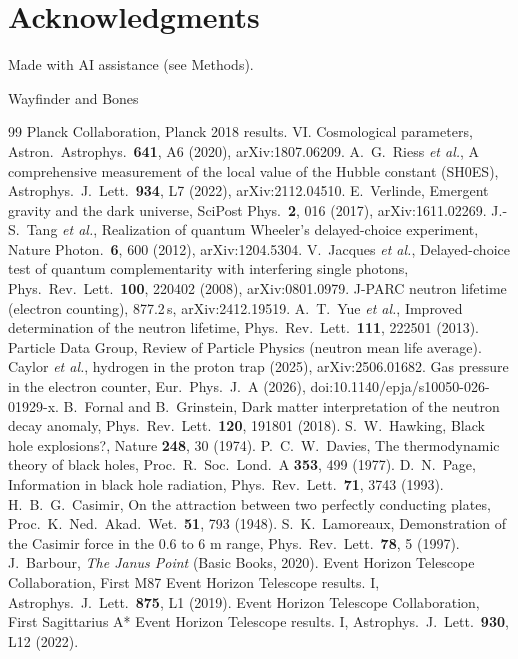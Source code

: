 \documentclass[11pt]{article}
\begin{document}
\section*{Acknowledgments}
Made with AI assistance (see Methods). \par\medskip Wayfinder and Bones
\begin{thebibliography}{99}
 Planck Collaboration, Planck 2018 results. VI. Cosmological parameters, Astron.\ Astrophys.\ \textbf{641}, A6 (2020), arXiv:1807.06209.
 A.~G.~Riess \emph{et al.}, A comprehensive measurement of the local value of the Hubble constant (SH0ES), Astrophys.\ J.\ Lett.\ \textbf{934}, L7 (2022), arXiv:2112.04510.
 E.~Verlinde, Emergent gravity and the dark universe, SciPost Phys.\ \textbf{2}, 016 (2017), arXiv:1611.02269.
 J.-S.~Tang \emph{et al.}, Realization of quantum Wheeler's delayed-choice experiment, Nature Photon.\ \textbf{6}, 600 (2012), arXiv:1204.5304.
 V.~Jacques \emph{et al.}, Delayed-choice test of quantum complementarity with interfering single photons, Phys.\ Rev.\ Lett.\ \textbf{100}, 220402 (2008), arXiv:0801.0979.
 J-PARC neutron lifetime (electron counting), 877.2\,s, arXiv:2412.19519.
 A.~T.~Yue \emph{et al.}, Improved determination of the neutron lifetime, Phys.\ Rev.\ Lett.\ \textbf{111}, 222501 (2013).
 Particle Data Group, Review of Particle Physics (neutron mean life average).
 Caylor \emph{et al.}, hydrogen in the proton trap (2025), arXiv:2506.01682.
 Gas pressure in the electron counter, Eur.\ Phys.\ J.\ A (2026), doi:10.1140/epja/s10050-026-01929-x.
 B.~Fornal and B.~Grinstein, Dark matter interpretation of the neutron decay anomaly, Phys.\ Rev.\ Lett.\ \textbf{120}, 191801 (2018).
 S.~W.~Hawking, Black hole explosions?, Nature \textbf{248}, 30 (1974).
 P.~C.~W.~Davies, The thermodynamic theory of black holes, Proc.\ R.\ Soc.\ Lond.\ A \textbf{353}, 499 (1977).
 D.~N.~Page, Information in black hole radiation, Phys.\ Rev.\ Lett.\ \textbf{71}, 3743 (1993).
 H.~B.~G.~Casimir, On the attraction between two perfectly conducting plates, Proc.\ K.\ Ned.\ Akad.\ Wet.\ \textbf{51}, 793 (1948).
 S.~K.~Lamoreaux, Demonstration of the Casimir force in the 0.6 to 6 \textmu m range, Phys.\ Rev.\ Lett.\ \textbf{78}, 5 (1997).
 J.~Barbour, \emph{The Janus Point} (Basic Books, 2020).
 Event Horizon Telescope Collaboration, First M87 Event Horizon Telescope results. I, Astrophys.\ J.\ Lett.\ \textbf{875}, L1 (2019).
 Event Horizon Telescope Collaboration, First Sagittarius A* Event Horizon Telescope results. I, Astrophys.\ J.\ Lett.\ \textbf{930}, L12 (2022).
\end{thebibliography}
\end{document}
